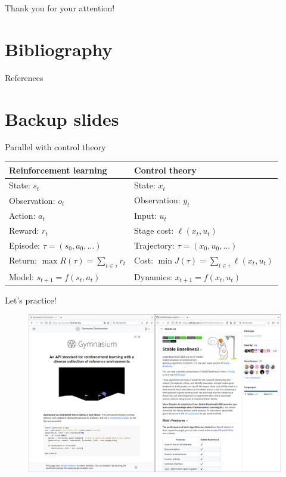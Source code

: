 \documentclass[10pt, aspectratio=1610]{beamer}
\begin{document}
\begin{frame}[standout]
Thank you for your attention!
\end{frame}

\section*{Bibliography}

\renewcommand*{\bibfont}{\footnotesize}
\begin{frame}[allowframebreaks]{References}
    \printbibliography[heading=none]
\end{frame}

\section*{Backup slides}

\begin{frame}{Parallel with control theory}
    \begin{table}
        \begin{tabular}{ll}
            \textbf{Reinforcement learning} & \textbf{Control theory} \\
            \hline
            State: $s_t$ & State: $x_t$ \\
            Observation: $o_t$ & Observation: $y_t$ \\
            Action: $a_t$ & Input: $u_t$ \\
            Reward: $r_t$ & Stage cost: $\ell(x_t, u_t)$ \\
            Episode: $\tau = (s_0, a_0, \ldots)$ & Trajectory: $\tau = (x_0, u_0, \ldots)$ \\
            Return: $\max R(\tau) = \sum_{t \in \tau} r_t$ & Cost: $\min J(\tau) = \sum_{t \in \tau} \ell(x_t, u_t)$ \\
            Model: $s_{t+1} = f(s_t, a_t)$ & Dynamics: $x_{t+1} = f(x_t, u_t)$ \\
        \end{tabular}
    \end{table}
\end{frame}

\begin{frame}{Let's practice!}
    \begin{figure}
        \includegraphics[width=0.99\columnwidth]{figures/gymnasium-sb3.png}
    \end{figure}
\end{frame}
\end{document}
